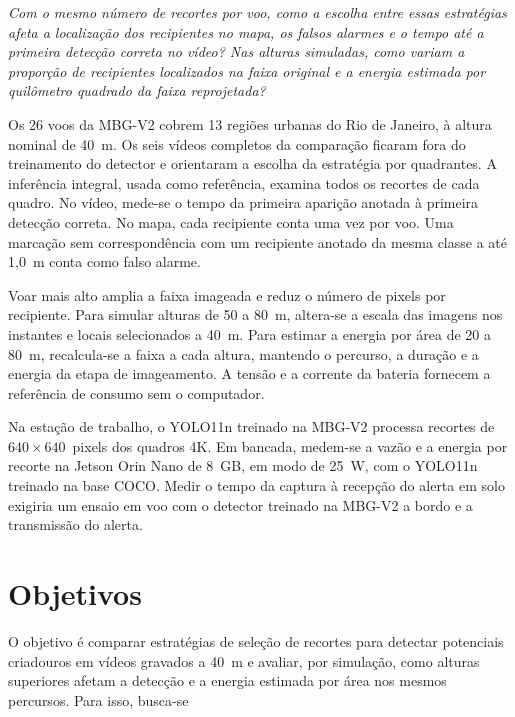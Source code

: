\textit{Com o mesmo número de recortes por voo, como a escolha entre essas estratégias afeta a localização dos recipientes no mapa, os falsos alarmes e o tempo até a primeira detecção correta no vídeo? Nas alturas simuladas, como variam a proporção de recipientes localizados na faixa original e a energia estimada por quilômetro quadrado da faixa reprojetada?}

Os 26 voos da MBG-V2 cobrem 13 regiões urbanas do Rio de Janeiro, à altura nominal de 40~m. Os seis vídeos completos da comparação ficaram fora do treinamento do detector e orientaram a escolha da estratégia por quadrantes. A inferência integral, usada como referência, examina todos os recortes de cada quadro. No vídeo, mede-se o tempo da primeira aparição anotada à primeira detecção correta. No mapa, cada recipiente conta uma vez por voo. Uma marcação sem correspondência com um recipiente anotado da mesma classe a até 1,0~m conta como falso alarme.

Voar mais alto amplia a faixa imageada e reduz o número de pixels por recipiente. Para simular alturas de 50 a 80~m, altera-se a escala das imagens nos instantes e locais selecionados a 40~m. Para estimar a energia por área de 20 a 80~m, recalcula-se a faixa a cada altura, mantendo o percurso, a duração e a energia da etapa de imageamento. A tensão e a corrente da bateria fornecem a referência de consumo sem o computador.

Na estação de trabalho, o YOLO11n treinado na MBG-V2 processa recortes de $640\times640$~pixels dos quadros 4K. Em bancada, medem-se a vazão e a energia por recorte na Jetson Orin Nano de 8~GB, em modo de 25~W, com o YOLO11n treinado na base COCO. Medir o tempo da captura à recepção do alerta em solo exigiria um ensaio em voo com o detector treinado na MBG-V2 a bordo e a transmissão do alerta.

\section{Objetivos}

O objetivo é comparar estratégias de seleção de recortes para detectar potenciais criadouros em vídeos gravados a 40~m e avaliar, por simulação, como alturas superiores afetam a detecção e a energia estimada por área nos mesmos percursos. Para isso, busca-se

